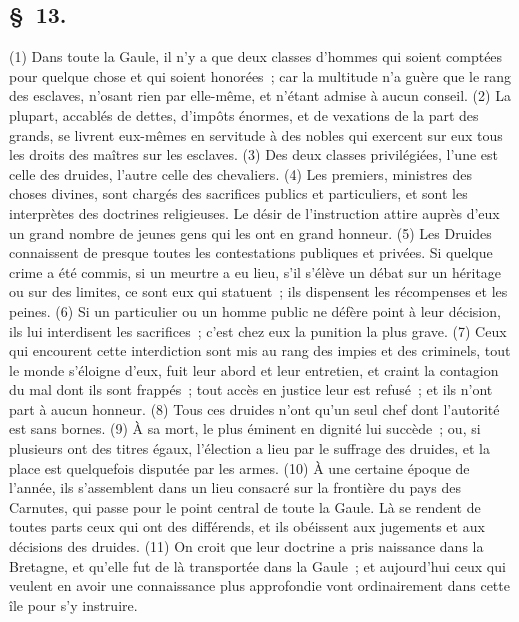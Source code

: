 \documentclass[french,twoside]{book} %
\begin{document}
\subsection[{§ 13.}]{ \textsc{§ 13.} }
\noindent (1) Dans toute la Gaule, il n’y a que deux classes d’hommes qui soient comptées pour quelque chose et qui soient honorées ; car la multitude n’a guère que le rang des esclaves, n’osant rien par elle-même, et n’étant admise à aucun conseil. (2) La plupart, accablés de dettes, d’impôts énormes, et de vexations de la part des grands, se livrent eux-mêmes en servitude à des nobles qui exercent sur eux tous les droits des maîtres sur les esclaves. (3) Des deux classes privilégiées, l’une est celle des druides, l’autre celle des chevaliers. (4) Les premiers, ministres des choses divines, sont chargés des sacrifices publics et particuliers, et sont les interprètes des doctrines religieuses. Le désir de l’instruction attire auprès d’eux un grand nombre de jeunes gens qui les ont en grand honneur. (5) Les Druides connaissent de presque toutes les contestations publiques et privées. Si quelque crime a été commis, si un meurtre a eu lieu, s’il s’élève un débat sur un héritage ou sur des limites, ce sont eux qui statuent ; ils dispensent les récompenses et les peines. (6) Si un particulier ou un homme public ne défère point à leur décision, ils lui interdisent les sacrifices ; c’est chez eux la punition la plus grave. (7) Ceux qui encourent cette interdiction sont mis au rang des impies et des criminels, tout le monde s’éloigne d’eux, fuit leur abord et leur entretien, et craint la contagion du mal dont ils sont frappés ; tout accès en justice leur est refusé ; et ils n’ont part à aucun honneur. (8) Tous ces druides n’ont qu’un seul chef dont l’autorité est sans bornes. (9) À sa mort, le plus éminent en dignité lui succède ; ou, si plusieurs ont des titres égaux, l’élection a lieu par le suffrage des druides, et la place est quelquefois disputée par les armes. (10) À une certaine époque de l’année, ils s’assemblent dans un lieu consacré sur la frontière du pays des Carnutes, qui passe pour le point central de toute la Gaule. Là se rendent de toutes parts ceux qui ont des différends, et ils obéissent aux jugements et aux décisions des druides. (11) On croit que leur doctrine a pris naissance dans la Bretagne, et qu’elle fut de là transportée dans la Gaule ; et aujourd’hui ceux qui veulent en avoir une connaissance plus approfondie vont ordinairement dans cette île pour s’y instruire.
\end{document}
